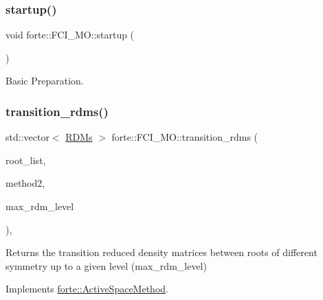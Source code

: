 \subsubsection{\texorpdfstring{startup()}{startup()}}
{\footnotesize\ttfamily void forte\+::\+F\+C\+I\+\_\+\+M\+O\+::startup (\begin{DoxyParamCaption}{ }\end{DoxyParamCaption})\hspace{0.3cm}{\ttfamily [protected]}}



Basic Preparation. 

\mbox{\label{classforte_1_1_f_c_i___m_o_a62d0c9bbee3dc8942ab109354074ad87}} 
\subsubsection{\texorpdfstring{transition\+\_\+rdms()}{transition\_rdms()}}
{\footnotesize\ttfamily std\+::vector$<$ \mbox{\hyperlink{classforte_1_1_r_d_ms}{R\+D\+Ms}} $>$ forte\+::\+F\+C\+I\+\_\+\+M\+O\+::transition\+\_\+rdms (\begin{DoxyParamCaption}\item[{const std\+::vector$<$ std\+::pair$<$ size\+\_\+t, size\+\_\+t $>$$>$ \&}]{root\+\_\+list,  }\item[{std\+::shared\+\_\+ptr$<$ \mbox{\hyperlink{classforte_1_1_active_space_method}{Active\+Space\+Method}} $>$}]{method2,  }\item[{int}]{max\+\_\+rdm\+\_\+level }\end{DoxyParamCaption})\hspace{0.3cm}{\ttfamily [override]}, {\ttfamily [virtual]}}

Returns the transition reduced density matrices between roots of different symmetry up to a given level (max\+\_\+rdm\+\_\+level) 

Implements \mbox{\hyperlink{classforte_1_1_active_space_method_a4460069915e56a1994d3a4a4e78bdb30}{forte\+::\+Active\+Space\+Method}}.

\mbox{\label{classforte_1_1_f_c_i___m_o_a125253e41b65e862b172de71eb3c42b6}} 
